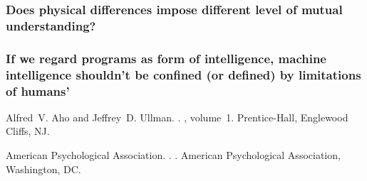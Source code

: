 \documentclass[11pt]{article}
\begin{document}
\subsubsection{Does physical differences impose different level of mutual understanding?}

\subsubsection{If we regard programs as form of intelligence, machine intelligence shouldn't be confined (or defined) by limitations of humans'}

%
%

\begin{thebibliography}{}

Alfred~V. Aho and Jeffrey~D. Ullman.
.
, volume~1.
\newblock Prentice-{Hall}, Englewood Cliffs, NJ.

{American Psychological Association}.
.
.
\newblock American Psychological Association, Washington, DC.

\end{thebibliography}
\end{document}

